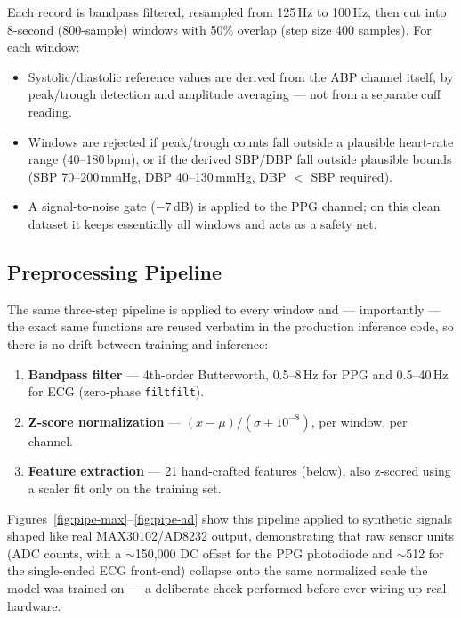 \documentclass[12pt,a4paper]{report}
\begin{document}
Each record is bandpass filtered, resampled from 125\,Hz to 100\,Hz, then cut
into 8-second (800-sample) windows with 50\% overlap (step size 400 samples).
For each window:

\begin{itemize}[leftmargin=1.4em]
  \item Systolic/diastolic reference values are derived from the ABP channel
  itself, by peak/trough detection and amplitude averaging --- not from a
  separate cuff reading.
  \item Windows are rejected if peak/trough counts fall outside a plausible
  heart-rate range (40--180\,bpm), or if the derived SBP/DBP fall outside
  plausible bounds (SBP 70--200\,mmHg, DBP 40--130\,mmHg, DBP $<$ SBP required).
  \item A signal-to-noise gate ($-7$\,dB) is applied to the PPG channel; on this
  clean dataset it keeps essentially all windows and acts as a safety net.
\end{itemize}

\subsection{Preprocessing Pipeline}

The same three-step pipeline is applied to every window and --- importantly ---
the exact same functions are reused verbatim in the production inference code,
so there is no drift between training and inference:

\begin{enumerate}[leftmargin=1.6em]
  \item \textbf{Bandpass filter} --- 4th-order Butterworth, 0.5--8\,Hz for PPG
  and 0.5--40\,Hz for ECG (zero-phase \texttt{filtfilt}).
  \item \textbf{Z-score normalization} --- $(x-\mu)/(\sigma+10^{-8})$, per
  window, per channel.
  \item \textbf{Feature extraction} --- 21 hand-crafted features (below), also
  z-scored using a scaler fit only on the training set.
\end{enumerate}

Figures~\ref{fig:pipe-max}--\ref{fig:pipe-ad} show this pipeline applied to
synthetic signals shaped like real MAX30102/AD8232 output, demonstrating that
raw sensor units (ADC counts, with a $\sim$150{,}000 DC offset for the PPG
photodiode and $\sim$512 for the single-ended ECG front-end) collapse onto the
same normalized scale the model was trained on --- a deliberate check performed
before ever wiring up real hardware.
\end{document}
